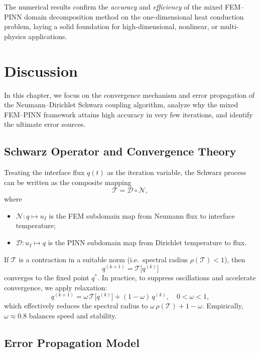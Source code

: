 \documentclass[12pt]{article}
\begin{document}
The numerical results confirm the \emph{accuracy} and \emph{efficiency} of the mixed FEM–PINN domain decomposition method on the one-dimensional heat conduction problem, laying a solid foundation for high-dimensional, nonlinear, or multi-physics applications.

\section{Discussion}

In this chapter, we focus on the convergence mechanism and error propagation of the Neumann–Dirichlet Schwarz coupling algorithm, analyze why the mixed FEM–PINN framework attains high accuracy in very few iterations, and identify the ultimate error sources.

\subsection{Schwarz Operator and Convergence Theory}

Treating the interface flux \(q(t)\) as the iteration variable, the Schwarz process can be written as the composite mapping
\begin{equation}
  \mathcal{T} = \mathcal{D}\circ\mathcal{N},
\end{equation}
where
\begin{itemize}
  \item \(\mathcal{N}\colon q\mapsto u_I\) is the FEM subdomain map from Neumann flux to interface temperature;
  \item \(\mathcal{D}\colon u_I\mapsto q\) is the PINN subdomain map from Dirichlet temperature to flux.
\end{itemize}
If \(\mathcal{T}\) is a contraction in a suitable norm (i.e.\ spectral radius \(\rho(\mathcal{T})<1\))\cite{gander_schwarz_2008}, then
\begin{equation}
  q^{(k+1)} = \mathcal{T}\bigl[q^{(k)}\bigr]
\end{equation}
converges to the fixed point \(q^*\).  In practice, to suppress oscillations and accelerate convergence, we apply relaxation:
\begin{equation}
  q^{(k+1)}
  = \omega\,\mathcal{T}\bigl[q^{(k)}\bigr]
    + (1-\omega)\,q^{(k)},\quad 0<\omega<1,
\end{equation}
which effectively reduces the spectral radius to \(\omega\,\rho(\mathcal{T}) + 1-\omega\).  Empirically, \(\omega\approx0.8\) balances speed and stability.

\subsection{Error Propagation Model}
\end{document}
